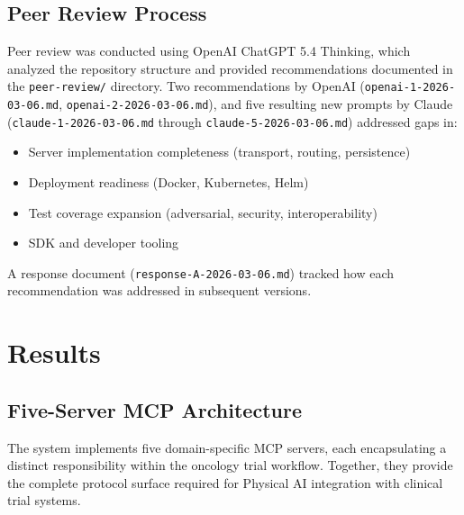 \subsection{Peer Review Process}

Peer review was conducted using OpenAI ChatGPT 5.4 Thinking, which analyzed the repository structure and provided recommendations documented in the \texttt{peer-review/} directory. Two recommendations by OpenAI (\texttt{openai-1-2026-03-06.md}, \texttt{openai-2-2026-03-06.md}), and five resulting new prompts by Claude (\texttt{claude-1-2026-03-06.md} through \texttt{claude-5-2026-03-06.md}) addressed gaps in:

\begin{itemize}[leftmargin=*]
\item Server implementation completeness (transport, routing, persistence)
\item Deployment readiness (Docker, Kubernetes, Helm)
\item Test coverage expansion (adversarial, security, interoperability)
\item SDK and developer tooling
\end{itemize}

A response document (\texttt{response-A-2026-03-06.md}) tracked how each recommendation was addressed in subsequent versions.

\section{Results}
\label{sec:results}

\subsection{Five-Server MCP Architecture}

The system implements five domain-specific MCP servers, each encapsulating a distinct responsibility within the oncology trial workflow. Together, they provide the complete protocol surface required for Physical AI integration with clinical trial systems.

